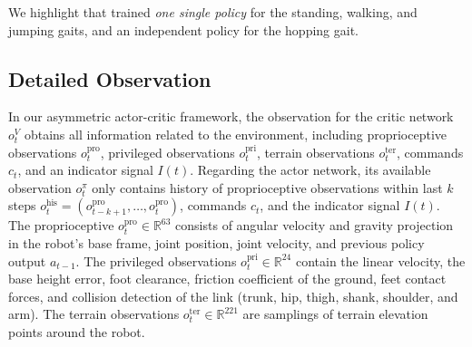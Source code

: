 We highlight that \our trained \textit{one single policy} for the standing, walking, and jumping gaits, and an independent policy for the hopping gait.


\subsection{Detailed Observation} 
\label{sec:OBS}
In our asymmetric actor-critic framework, the observation for the critic network $o^{V}_t$ obtains all information related to the environment,
including proprioceptive observations $o_t^{\text{pro}}$, privileged observations $o_t^{\text{pri}}$, terrain observations $o_t^{\text{ter}}$, commands $c_t$, and an indicator signal $I(t)$. Regarding the actor network, its available observation $o_t^{\pi}$ only contains history of proprioceptive observations within last $k$ steps $o_t^{\text{his}} = (o_{t-k+1}^{\text{pro}}, \dots, o_t^{\text{pro}})$, commands $c_t$, and the indicator signal $I(t)$.
The proprioceptive $o_t^{\text{pro}} \in \mathbb{R}^{63}$ consists of angular velocity and gravity projection in the robot's base frame, joint position, joint velocity, and previous policy output $a_{t-1}$. 
The privileged observations $o_t^{\text{pri}} \in \mathbb{R}^{24}$ contain the linear velocity, the base height error, foot clearance, friction coefficient of the ground, feet contact forces, and collision detection of the link (trunk, hip, thigh, shank, shoulder, and arm). The terrain observations $o_t^{\text{ter}} \in \mathbb{R}^{221}$ are samplings of terrain elevation points around the robot.


